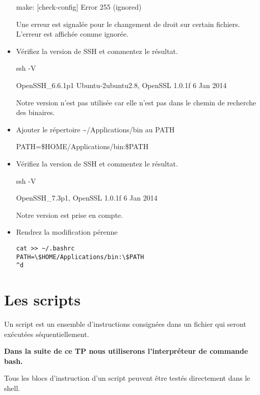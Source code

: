 \documentclass[11pt]{article}
\begin{document}
\begin{itemize}
\begin{solution}
make: [check-config] Error 255 (ignored)

Une erreur est signalée pour le changement de droit sur certain fichiers. L'erreur est affichée comme ignorée.

\end{solution}
 \item Vérifiez la version de SSH et commentez le résultat.
\begin{solution}

ssh -V

OpenSSH\_6.6.1p1 Ubuntu-2ubuntu2.8, OpenSSL 1.0.1f 6 Jan 2014

Notre version n'est pas utilisée car elle n'est pas dans le chemin de recherche des binaires.

\end{solution}

 \item Ajouter le répertoire \textasciitilde{}/Applications/bin au PATH
\begin{solution}

PATH=\$HOME/Applications/bin:\$PATH
\end{solution}

 \item Vérifiez la version de SSH et commentez le résultat.
\begin{solution}

ssh -V

OpenSSH\_7.3p1, OpenSSL 1.0.1f 6 Jan 2014

Notre version est prise en compte.
\end{solution}
 \item Rendrez la modification pérenne
\begin{solution}
\begin{lstlisting}
cat >> ~/.bashrc
PATH=\$HOME/Applications/bin:\$PATH
^d
\end{lstlisting}
\end{solution}
\end{itemize}

\section{Les scripts}

Un script est un ensemble d'instructions consignées dans un fichier qui seront exécutées séquentiellement.

\textbf{Dans la suite de ce TP nous utiliserons l'interpréteur de commande bash.}

Tous les blocs d'instruction d'un script peuvent être testés directement dans le shell.
\end{document}
